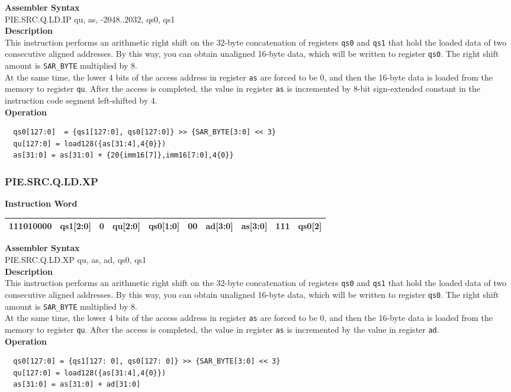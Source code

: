 \textbf{Assembler Syntax} \\
PIE.SRC.Q.LD.IP qu, as, -2048..2032, qs0, qs1 \\
\textbf{Description} \\
This instruction performs an arithmetic right shift on the 32-byte concatenation of registers \lstinline{qs0} and \lstinline{qs1} that hold the loaded data of two consecutive aligned addresses. By this way, you can obtain unaligned 16-byte data, which will be written to register \lstinline{qs0}. The right shift amount is \lstinline{SAR_BYTE} multiplied by 8.\\
At the same time, the lower 4 bits of the access address in register \lstinline{as} are forced to be 0, and then the 16-byte data is loaded from the memory to register \lstinline{qu}. After the access is completed, the value in register \lstinline{as} is incremented by 8-bit sign-extended constant in the instruction code segment left-shifted by 4.\\
\textbf{Operation}
\begin{lstlisting}
  qs0[127:0]  = {qs1[127:0], qs0[127:0]} >> {SAR_BYTE[3:0] << 3}
  qu[127:0] = load128({as[31:4],4{0}})
  as[31:0] = as[31:0] + {20{imm16[7]},imm16[7:0],4{0}}
\end{lstlisting}

\newpage
\subsubsection{PIE.SRC.Q.LD.XP}\label{instruction:PIESRCQLDXP}
\setlength\tabcolsep{6pt}
\textbf{Instruction Word} \\
\begin{tabular}{|c|c|c|c|c|c|c|c|c|c|}
	\hline
	111010000 & qs1[2:0] & 0 & qu[2:0] & qs0[1:0] & 00 & ad[3:0] & as[3:0] & 111 & qs0[2] \\
	\hline
\end{tabular}

\textbf{Assembler Syntax} \\
PIE.SRC.Q.LD.XP qu, as, ad, qs0, qs1 \\
\textbf{Description} \\
This instruction performs an arithmetic right shift on the 32-byte concatenation of registers \lstinline{qs0} and \lstinline{qs1} that hold the loaded data of two consecutive aligned addresses. By this way, you can obtain unaligned 16-byte data, which will be written to register \lstinline{qs0}. The right shift amount is \lstinline{SAR_BYTE} multiplied by 8.\\
At the same time, the lower 4 bits of the access address in register \lstinline{as} are forced to be 0, and then the 16-byte data is loaded from the memory to register \lstinline{qu}. After the access is completed, the value in register \lstinline{as} is incremented by the value in register \lstinline{ad}.\\
\textbf{Operation}
\begin{lstlisting}
  qs0[127:0] = {qs1[127: 0], qs0[127: 0]} >> {SAR_BYTE[3:0] << 3}
  qu[127:0] = load128({as[31:4],4{0}})
  as[31:0] = as[31:0] + ad[31:0]
\end{lstlisting}

